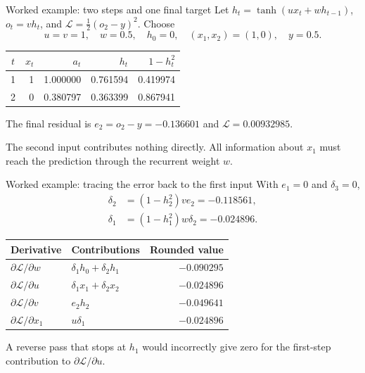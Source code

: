 \documentclass[aspectratio=169,11pt]{beamer}
\begin{document}
\begin{frame}{Worked example: two steps and one final target}
Let $h_t=\tanh(ux_t+wh_{t-1})$, $o_t=vh_t$, and
$\mathcal L=\frac12(o_2-y)^2$. Choose
\[
u=v=1,\quad w=0.5,\quad h_0=0,\quad (x_1,x_2)=(1,0),\quad y=0.5 .
\]
\begin{center}\begin{tabular}{crrrr}\toprule
$t$ & $x_t$ & $a_t$ & $h_t$ & $1-h_t^2$\\\midrule
1 & 1 & 1.000000 & 0.761594 & 0.419974\\
2 & 0 & 0.380797 & 0.363399 & 0.867941\\\bottomrule
\end{tabular}\end{center}
The final residual is $e_2=o_2-y=-0.136601$ and $\mathcal L=0.00932985$.

The second input contributes nothing directly. All information about $x_1$
must reach the prediction through the recurrent weight $w$.
\end{frame}
\begin{frame}{Worked example: tracing the error back to the first input}
With $e_1=0$ and $\delta_3=0$,
\begin{align*}
\delta_2&=(1-h_2^2)ve_2=-0.118561,\\
\delta_1&=(1-h_1^2)w\delta_2=-0.024896 .
\end{align*}
\begin{center}\begin{tabular}{llr}\toprule
Derivative & Contributions & Rounded value\\\midrule
$\partial\mathcal L/\partial w$ & $\delta_1 h_0+\delta_2h_1$ & $-0.090295$\\
$\partial\mathcal L/\partial u$ & $\delta_1x_1+\delta_2x_2$ & $-0.024896$\\
$\partial\mathcal L/\partial v$ & $e_2h_2$ & $-0.049641$\\
$\partial\mathcal L/\partial x_1$ & $u\delta_1$ & $-0.024896$\\\bottomrule
\end{tabular}\end{center}
A reverse pass that stops at $h_1$ would incorrectly give zero for the
first-step contribution to $\partial\mathcal L/\partial u$.
\end{frame}
\end{document}
